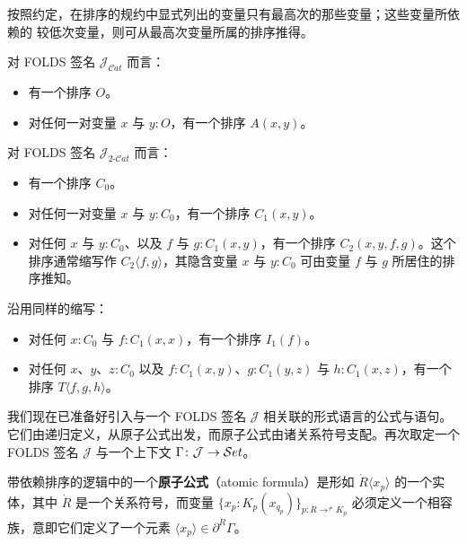 \begin{definition}[排序及其变量]
按照约定，在排序的规约中显式列出的变量只有最高次的那些变量；这些变量所依赖的
较低次变量，则可从最高次变量所属的排序推得。
\end{definition}

\begin{example}\label{exa:sorts-jcat}
对 FOLDS 签名 $\mathcal{J}_{\mathcal{C}at}$ 而言：
\begin{itemize}
\item 有一个排序 $O$。
\item 对任何一对变量 $x$ 与 $y:O$，有一个排序 $A(x,y)$。
\end{itemize}
\end{example}

\begin{example}\label{exa:sorts-j2cat}
对 FOLDS 签名 $\mathcal{J}_{2\text{-}\mathcal{C}at}$ 而言：
\begin{itemize}
\item 有一个排序 $C_{0}$。
\item 对任何一对变量 $x$ 与 $y:C_{0}$，有一个排序 $C_{1}(x,y)$。
\item 对任何 $x$ 与 $y:C_{0}$、以及 $f$ 与 $g:C_{1}(x,y)$，有一个排序
  $C_{2}(x,y,f,g)$。这个排序通常缩写作 $C_{2}\langle f,g\rangle$，其隐含变量
  $x$ 与 $y:C_{0}$ 可由变量 $f$ 与 $g$ 所居住的排序推知。
\end{itemize}
\end{example}

沿用同样的缩写：
\begin{itemize}
\item 对任何 $x:C_{0}$ 与 $f:C_{1}(x,x)$，有一个排序 $I_{1}(f)$。
\item 对任何 $x$、$y$、$z:C_{0}$ 以及 $f:C_{1}(x,y)$、$g:C_{1}(y,z)$ 与
  $h:C_{1}(x,z)$，有一个排序 $T\langle f,g,h\rangle$。
\end{itemize}

我们现在已准备好引入与一个 FOLDS 签名 $\mathcal{J}$ 相关联的形式语言的公式与语句。
它们由递归定义，从原子公式出发，而原子公式由诸关系符号支配。再次取定一个 FOLDS
签名 $\mathcal{J}$ 与一个上下文 $\Gamma\colon\mathcal{J}\to\mathcal{S}et$。

\begin{definition}\label{def:atomic-formula}
带依赖排序的逻辑中的一个\textbf{原子公式}（atomic formula）是形如
$\dot{R}\langle x_{p}\rangle$ 的一个实体，其中 $\dot{R}$ 是一个关系符号，而变量
$\{x_{p}\mathbin{:}K_{p}(x_{q_{p}})\}_{p\colon \dot{R}\to^{\neq}K_{p}}$
必须定义一个相容族，意即它们定义了一个元素
$\langle x_{p}\rangle\in\partial^{\dot{R}}\Gamma$。
\end{definition}

